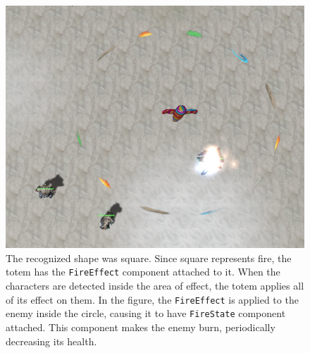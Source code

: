 \begin{figure}[p]
\centering
\includegraphics[width=.6\linewidth]{ext/scr/komix6.png}
\caption{The recognized shape was square. Since square represents fire, the totem has the \texttt{FireEffect} component attached to it. When the characters are detected inside the area of effect, the totem applies all of its effect on them. In the figure, the \texttt{FireEffect} is applied to the enemy inside the circle, causing it to have \texttt{FireState} component attached. This component makes the enemy burn, periodically decreasing its health.}
\label{fig:effect}
\end{figure}
